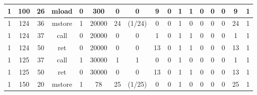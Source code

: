 \begin{table}[!ht]
\begin{adjustwidth}{-1.75cm}{}
\begin{tabular}{|c|c|c|c|c|c|c|c|c|c|c|c|c|c|c|c|c|}
            \hline
            \rowcolor{green!20} 1      & 100    & 26    & mload  & 0         & 300   & 0                              & 0                           & 9                           & \cellcolor{lightgray} 0 & \cellcolor{violet!30} 1     & 1     & \cellcolor{pink} 0     & \cellcolor{pink} 0     & \cellcolor{pink} 0     & 9        & 1     \\
            \hline
            \rowcolor{green!20} 1      & 124    & 36    & mstore & 1         & 20000 & 24                             & (1/24)                      & \cellcolor{lightgray} 0     & \cellcolor{lightgray} 0 & \cellcolor{violet!30} 1     & 0     & \cellcolor{pink} 0     & \cellcolor{pink} 0     & \cellcolor{pink} 0     & 24       & 1     \\
            \hline
            \rowcolor{green!20} 1      & 124    & 37    & call   & 0         & 20000 & 0                              & 0                           & 1                           & \cellcolor{lightgray} 0 & \cellcolor{violet!30} 1     & 1     & \cellcolor{pink} 0     & \cellcolor{pink} 0     & \cellcolor{pink} 0     & 1        & 1     \\
            \hline
            \rowcolor{green!20} 1      & 124    & 50    & ret    & 0         & 20000 & 0                              & 0                           & 13                          & \cellcolor{lightgray} 0 & \cellcolor{violet!30} 1     & 1     & \cellcolor{pink} 0     & \cellcolor{pink} 0     & \cellcolor{pink} 0     & 13       & 1     \\
            \hline
            \rowcolor{green!20} 1      & 125    & 37    & call   & 1         & 30000 & 1                              & 1                           & \cellcolor{lightgray} 0     & \cellcolor{lightgray} 0 & \cellcolor{violet!30} 1     & 0     & \cellcolor{pink} 0     & \cellcolor{pink} 0     & \cellcolor{pink} 0     & 1        & 1     \\
            \hline
            \rowcolor{green!20} 1      & 125    & 50    & ret    & 0         & 30000 & 0                              & 0                           & 13                          & \cellcolor{lightgray} 0 & \cellcolor{violet!30} 1     & 1     & \cellcolor{pink} 0     & \cellcolor{pink} 0     & \cellcolor{pink} 0     & 13       & 1     \\
            \hline
            \rowcolor{green!20} 1      & 150    & 20    & mstore & 1         & 78    & 25                             & (1/25)                      & \cellcolor{lightgray} 0     & \cellcolor{lightgray} 0 & \cellcolor{violet!30} 1     & 0     & \cellcolor{pink} 0     & \cellcolor{pink} 0     & \cellcolor{pink} 0     & 25       & 1     \\

\end{tabular}
\end{adjustwidth}
\end{table}
